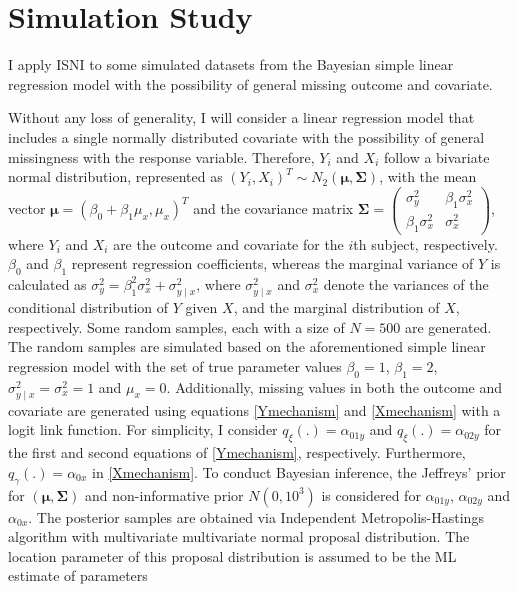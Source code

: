 \documentclass[twoside]{article}
\begin{document}
\section{Simulation Study}
 I apply ISNI to some simulated
datasets from the Bayesian simple linear regression model with the possibility of general  missing outcome and covariate.

Without any loss of generality, I will consider a linear regression
model that includes a single normally distributed covariate with the possibility of
general missingness with the response variable. Therefore, $Y_i$ and $X_i$ follow a bivariate normal distribution, represented as $(Y_i,X_i)^T\sim N_2(\pmb\mu,\pmb\Sigma)$, with the mean vector $\pmb\mu=(\beta_0+\beta_1\mu_x,\mu_x)^T$ and the covariance matrix $\pmb\Sigma=
\begin{pmatrix}
\sigma^2_{y}& \beta_1\sigma^2_x \\
\beta_1\sigma^2_x & \sigma^2_x
\end{pmatrix}$,     
where $Y_i $ and $X_i$ are the outcome  and  covariate for the $i$th subject, respectively. $\beta_0$ and $\beta_1$ represent regression coefficients, whereas the marginal variance of $Y$ is calculated as $\sigma^2_{y}=\beta_{1}^2 \sigma^2_x+\sigma^2_{y\mid x}$, where $\sigma^2_{y\mid x}$ and $\sigma^2_{x}$ denote the variances of the conditional distribution of $Y$ given $X$, and the marginal distribution of $X$, respectively. Some random samples, each with a size of $N=500$ are generated. The random samples are  simulated based on the aforementioned simple linear regression model with the set of true parameter values  $\beta_0=1$, $\beta_1=2$, $\sigma^2_{y\mid x}=\sigma^2_x=1$ and $\mu_x=0$. Additionally,  missing values in both the outcome and covariate are generated using equations \eqref{Ymechanism} and \eqref{Xmechanism} with a logit link function. For simplicity, I consider  $q_\xi(.)=\alpha_{01y}$ and $q_\xi(.)=\alpha_{02y}$ for the first and second equations of \eqref{Ymechanism}, respectively. Furthermore, $q_{\gamma}(.)=\alpha_{0x}$ in \eqref{Xmechanism}. To conduct Bayesian inference, the Jeffreys’ prior for $(\pmb\mu,\pmb\Sigma)$ and  non-informative
prior $N(0,10^3)$ is considered for $\alpha_{01y}$, $\alpha_{02y}$ and $\alpha_{0x}$. The posterior samples are obtained via Independent Metropolis-Hastings algorithm with multivariate multivariate normal proposal distribution. The location parameter of this proposal distribution is assumed to be the ML estimate of parameters
\end{document}
